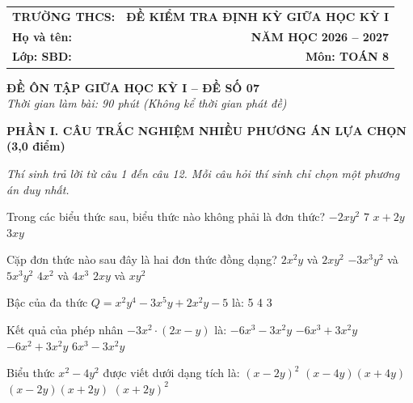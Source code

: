 \documentclass[12pt,a4paper]{article}
\begin{document}
\noindent
\begin{tabularx}{\linewidth}{X r}
\textbf{TRƯỜNG THCS: \dotfill} & \textbf{ĐỀ KIỂM TRA ĐỊNH KỲ GIỮA HỌC KỲ I} \\
\textbf{Họ và tên: \dotfill} & \textbf{NĂM HỌC 2026 -- 2027} \\
\textbf{Lớp: \dotfill \quad SBD: \dotfill} & \textbf{Môn: TOÁN 8} \\
\hline
\end{tabularx}
\vspace{2mm}

\begin{center}
  \textbf{\large ĐỀ ÔN TẬP GIỮA HỌC KỲ I -- ĐỀ SỐ 07}\\
  \textit{Thời gian làm bài: 90 phút (Không kể thời gian phát đề)}
\end{center}
\vspace{1mm}

\noindent\textbf{\large PHẦN I. CÂU TRẮC NGHIỆM NHIỀU PHƯƠNG ÁN LỰA CHỌN (3,0 điểm)}

\textit{Thí sinh trả lời từ câu 1 đến câu 12. Mỗi câu hỏi thí sinh chỉ chọn một phương án duy nhất.}

\vspace{1mm}
\begin{ex}
Trong các biểu thức sau, biểu thức nào không phải là đơn thức?
\choice
{$-2xy^2$}
{$7$}
{\True $x + 2y$}
{$3xy$}
\end{ex}

\begin{ex}
Cặp đơn thức nào sau đây là hai đơn thức đồng dạng?
\choice
{$2x^2y$ và $2xy^2$}
{\True $-3x^3y^2$ và $5x^3y^2$}
{$4x^2$ và $4x^3$}
{$2xy$ và $xy^2$}
\end{ex}

\begin{ex}
Bậc của đa thức $Q = x^2y^4 - 3x^5y + 2x^2y - 5$ là:
\choice
{}
{5}
{4}
{3}
\end{ex}

\begin{ex}
Kết quả của phép nhân $-3x^2 \cdot (2x - y)$ là:
\choice
{$-6x^3 - 3x^2y$}
{\True $-6x^3 + 3x^2y$}
{$-6x^2 + 3x^2y$}
{$6x^3 - 3x^2y$}
\end{ex}

\begin{ex}
Biểu thức $x^2 - 4y^2$ được viết dưới dạng tích là:
\choice
{$(x - 2y)^2$}
{$(x - 4y)(x + 4y)$}
{\True $(x - 2y)(x + 2y)$}
{$(x + 2y)^2$}
\end{ex}
\end{document}
